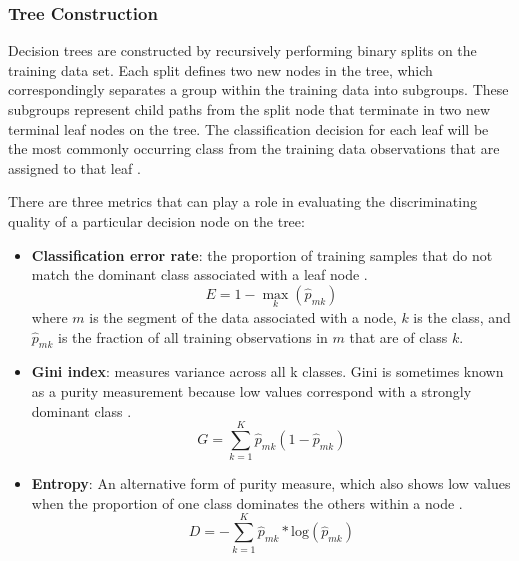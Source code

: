 \subsubsection{Tree Construction}
Decision trees are constructed by recursively performing binary splits on the training data set. Each split defines two new nodes in the tree, which correspondingly separates a group within the training data into subgroups. These subgroups represent child paths from the split node that terminate in two new terminal leaf nodes on the tree. The classification decision for each leaf will be the most commonly occurring class from the training data observations that are assigned to that leaf \citep[p. 311]{james_introduction_2013}.

There are three metrics that can play a role in evaluating the discriminating quality of a particular decision node on the tree:

\begin{itemize}[itemsep=2pt]
    \item \textbf{Classification error rate}: the proportion of training samples that do not match the dominant class associated with a leaf node \citep[p. 312]{james_introduction_2013}.
    \begin{equation}
    \label{eq:error_rate}
        E = 1 - \max_k(\hat{p}_{mk})
    \end{equation}
    where $m$ is the segment of the data associated with a node, $k$ is the class, and $\hat{p}_{mk}$ is the fraction of all training observations in $m$ that are of class $k$. 
    \item \textbf{Gini index}: measures variance across all k classes. Gini is sometimes known as a purity measurement because low values correspond with a strongly dominant class \citep[p. 312]{james_introduction_2013}.
    \begin{equation}
    \label{eq:gini}
        G = \sum_{k=1}^{K}{\hat{p}_{mk}(1-\hat{p}_{mk})}
    \end{equation}
    \item \textbf{Entropy}: An alternative form of purity measure, which also shows low values when the proportion of one class dominates the others within a node \citep[p. 312]{james_introduction_2013}.
    \begin{equation}
    \label{eq:entropy}
        D = -\sum_{k=1}^{K}{\hat{p}_{mk}* \text{log}(\hat{p}_{mk})}
    \end{equation}
\end{itemize}

